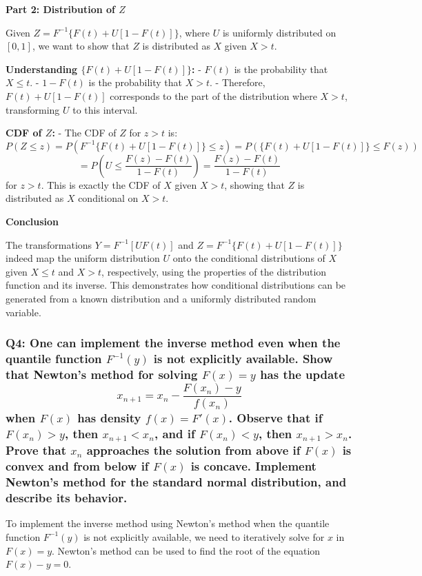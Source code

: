 \documentclass[8pt]{article}
\begin{document}
\textbf{Part 2: Distribution of \(Z\)}

Given \(Z = F^{-1}\{F(t) + U[1 - F(t)]\}\), where \(U\) is uniformly distributed on \([0, 1]\), we want to show that \(Z\) is distributed as \(X\) given \(X > t\).

\textbf{Understanding \(\{F(t) + U[1 - F(t)]\}\):}
- \(F(t)\) is the probability that \(X \leq t\).
- \(1 - F(t)\) is the probability that \(X > t\).
- Therefore, \(F(t) + U[1 - F(t)]\) corresponds to the part of the distribution where \(X > t\), transforming \(U\) to this interval.

\textbf{CDF of \(Z\):}
- The CDF of \(Z\) for \(z > t\) is:
  \[
  P(Z \leq z) = P(F^{-1}\{F(t) + U[1 - F(t)]\} \leq z) = P(\{F(t) + U[1 - F(t)]\} \leq F(z))
  \]
  \[
  = P(U \leq \frac{F(z) - F(t)}{1 - F(t)}) = \frac{F(z) - F(t)}{1 - F(t)}
  \]
  for \(z > t\). This is exactly the CDF of \(X\) given \(X > t\), showing that \(Z\) is distributed as \(X\) conditional on \(X > t\).

\textbf{Conclusion}

The transformations \(Y = F^{-1}[UF(t)]\) and \(Z = F^{-1}\{F(t) + U[1 - F(t)]\}\) indeed map the uniform distribution \(U\) onto the conditional distributions of \(X\) given \(X \leq t\) and \(X > t\), respectively, using the properties of the distribution function and its inverse. This demonstrates how conditional distributions can be generated from a known distribution and a uniformly distributed random variable.

\subsubsection*{Q4:
One can implement the inverse method even when the quantile function \(F^{-1}(y)\) is not explicitly available. Show that Newton's method for solving \(F(x) = y\) has the update
\[
x_{n+1} = x_n - \frac{F(x_n) - y}{f(x_n)}
\]
when \(F(x)\) has density \(f(x) = F'(x)\). Observe that if \(F(x_n) > y\), then \(x_{n+1} < x_n\), and if \(F(x_n) < y\), then \(x_{n+1} > x_n\). Prove that \(x_n\) approaches the solution from above if \(F(x)\) is convex and from below if \(F(x)\) is concave. Implement Newton's method for the standard normal distribution, and describe its behavior.}

To implement the inverse method using Newton's method when the quantile function \( F^{-1}(y) \) is not explicitly available, we need to iteratively solve for \( x \) in \( F(x) = y \). Newton's method can be used to find the root of the equation \( F(x) - y = 0 \).
\end{document}
